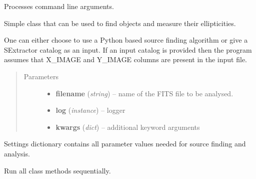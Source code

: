 \documentclass[a4paper,11pt,english]{sphinxmanual}
\begin{document}

\begin{fulllineitems}
\label{analysis:analysis.analyse.processArgs}
Processes command line arguments.

\end{fulllineitems}


\begin{fulllineitems}
Simple class that can be used to find objects and measure their ellipticities.

One can either choose to use a Python based source finding algorithm or
give a SExtractor catalog as an input. If an input catalog is provided
then the program assumes that X\_IMAGE and Y\_IMAGE columns are present
in the input file.
\begin{quote}\begin{description}
\item[{Parameters}] \leavevmode\begin{itemize}
\item {} 
\textbf{filename} (\emph{string}) -- name of the FITS file to be analysed.

\item {} 
\textbf{log} (\emph{instance}) -- logger

\item {} 
\textbf{kwargs} (\emph{dict}) -- additional keyword arguments

\end{itemize}

\end{description}\end{quote}

Settings dictionary contains all parameter values needed
for source finding and analysis.

\begin{fulllineitems}
Run all class methods sequentially.

\end{fulllineitems}



\end{fulllineitems}
\end{document}

